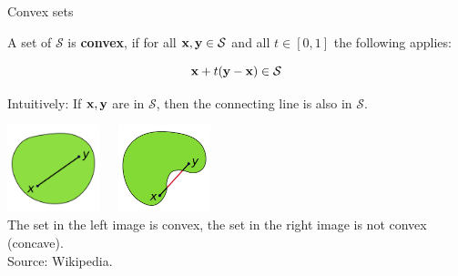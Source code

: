 \begin{vbframe}{Convex sets}

A set of $\mathcal{S}$ is \textbf{convex}, if for all $\mathbf{x}, \mathbf{y} \in \mathcal{S}$ and all $t \in [0, 1]$ the following applies:

$$
\mathbf{x} + t (\mathbf{y} - \mathbf{x}) \in \mathcal{S}
$$

Intuitively: If $\mathbf{x}, \mathbf{y}$ are in $\mathcal{S}$, then the connecting line is also in $\mathcal{S}$.

\begin{center}
\includegraphics[width = 0.2\textwidth]{figure_man/convex.png}~~~\includegraphics[width = 0.2\textwidth]{figure_man/concave.png} \\
\footnotesize{The set in the left image is convex, the set in the right image is not convex (concave). \\
Source: Wikipedia. 
}
\end{center}

\end{vbframe}

